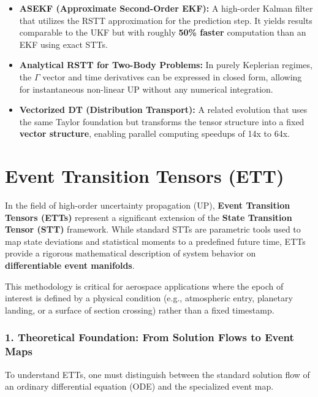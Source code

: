 \documentclass[
  letterpaper,
  DIV=11,
  numbers=noendperiod,
  oneside]{scrartcl}
\begin{document}
\begin{itemize}
\item
  \textbf{ASEKF (Approximate Second-Order EKF):} A high-order Kalman
  filter that utilizes the RSTT approximation for the prediction step.
  It yields results comparable to the UKF but with roughly \textbf{50\%
  faster} computation than an EKF using exact STTs.
\item
  \textbf{Analytical RSTT for Two-Body Problems:} In purely Keplerian
  regimes, the \(\Gamma\) vector and time derivatives can be expressed
  in closed form, allowing for instantaneous non-linear UP without any
  numerical integration.
\item
  \textbf{Vectorized DT (Distribution Transport):} A related evolution
  that uses the same Taylor foundation but transforms the tensor
  structure into a fixed \textbf{vector structure}, enabling parallel
  computing speedups of 14x to 64x.
\end{itemize}

\section{Event Transition Tensors
(ETT)}\label{event-transition-tensors-ett}

In the field of high-order uncertainty propagation (UP), \textbf{Event
Transition Tensors (ETTs)} represent a significant extension of the
\textbf{State Transition Tensor (STT)} framework. While standard STTs
are parametric tools used to map state deviations and statistical
moments to a predefined future time, ETTs provide a rigorous
mathematical description of system behavior on \textbf{differentiable
event manifolds}.

This methodology is critical for aerospace applications where the epoch
of interest is defined by a physical condition (e.g., atmospheric entry,
planetary landing, or a surface of section crossing) rather than a fixed
timestamp.

\subsubsection{1. Theoretical Foundation: From Solution Flows to Event
Maps}\label{theoretical-foundation-from-solution-flows-to-event-maps}

To understand ETTs, one must distinguish between the standard solution
flow of an ordinary differential equation (ODE) and the specialized
event map.
\end{document}
